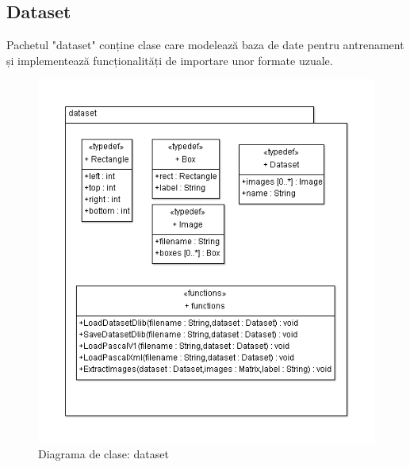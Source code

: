 \subsection{Dataset}
Pachetul "dataset" conține clase care modelează baza de date pentru antrenament și implementează funcționalități de importare unor formate uzuale.
\begin{figure}[H]
	\centering
	\includegraphics[width=1.0\textwidth]{uml/datasetClassDiagram.png}
	\caption{Diagrama de clase: dataset}
	\label{fig:datasetClassDiagram}
\end{figure}

